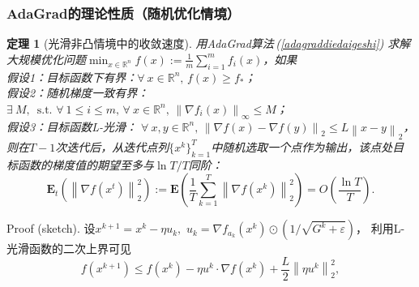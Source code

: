 \documentclass[9pt,aspectratio=169]{beamer}
\newtheorem{thm}{定理}
\newcommand{\any}{\forall \ }
\newcommand{\exi}{\exists \ }
\newcommand{\sothat}{\,\,\mathrm{s.t.}\,\,}
\begin{document}
\begin{frame}
	\frametitle{AdaGrad的理论性质（随机优化情境）}
\vspace{-0.3cm}
\begin{thm}[光滑非凸情境中的收敛速度]
	用AdaGrad算法\,(\ref{adagraddiedaigeshi})\,\,求解大规模优化问题$\min_{x\in \mathbb{R}^{n}} f(x):=\frac{1}{m}\sum_{i=1}^{m}f_i(x)$，如果
	\\ \vspace{0.2cm} 假设1：目标函数下有界：$\any x\in \mathbb{R}^{n},\,f(x)\geq f_{*}$；
\\ \vspace{0.1cm} 假设2：随机梯度一致有界：
    $\exi M,\,\sothat \any 1\leq i\leq m,\,\any x\in \mathbb{R}^{n},\,\left\| \nabla f_{i}(x) \right\|_\infty \leq M$；
\\ \vspace{0.1cm} 假设3：目标函数L-光滑：
  $\any x,y\in \mathbb{R}^{n},\,\left\| \nabla f(x)-\nabla f(y) \right\|_2 \leq L \left\| x-y \right\|_2 $，
 \\ \vspace{0.15cm} 则在$T-1$次迭代后，从迭代点列$\{x^k\}_{k=1}^T$中随机选取一个点作为输出，该点处目标函数的梯度值的期望至多与$\ln T/T$同阶：
	\begin{equation}\label{zhuyaojieguo}
		\mathbf{E}_{t}\left( \left\|\nabla f(x^{t}) \right\|_2^2 \right) :=\mathbf{E}\left( \frac{1}{T}\sum_{k=1}^{T}\left\|\nabla f(x^{k}) \right\|_2 ^2\right) =O \left( \frac{\ln T }{T} \right).
	\end{equation}
\end{thm}
\begin{block}{Proof (sketch).}
	设$x^{k+1}=x^k-\eta u_k,\,\,u_k=\nabla f_{a_k}(x^k)\odot (1 /\sqrt{G^k+\varepsilon})$，
	利用L-光滑函数的二次上界可见
	\begin{equation}\label{untitle6}
        f(x^{k+1})\leq f(x^k)-\eta u^k\cdot \nabla f(x^k)+ \frac{L}{2}\left\| \eta u^k \right\|_2 ^2,
    \end{equation}
\end{block}
\end{frame}
\end{document}
